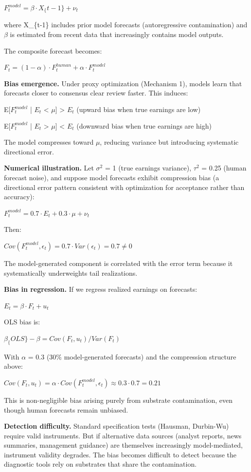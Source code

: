\documentclass[11pt,a4paper]{article}
\begin{document}
$F_t^{model} = \beta \cdot X_\{t-1\} + \nu_t$

where X\_\{t-1\} includes prior model forecasts (autoregressive contamination) and $\beta$ is estimated from recent data that increasingly contains model outputs.

The composite forecast becomes:

$F_t = (1 - \alpha) \cdot F_t^{human} + \alpha \cdot F_t^{model}$

\textbf{Bias emergence.} Under proxy optimization (Mechanism 1), models learn that forecasts closer to consensus clear review faster. This induces:

E{[}$F_t^{model}$ | $E_t$ < $\mu${]} > $E_t$ (upward bias when true earnings are low)

E{[}$F_t^{model}$ | $E_t$ > $\mu${]} < $E_t$ (downward bias when true earnings are high)

The model compresses toward $\mu$, reducing variance but introducing systematic directional error.

\textbf{Numerical illustration.} Let $\sigma^2$ = 1 (true earnings variance), $\tau^2$ = 0.25 (human forecast noise), and suppose model forecasts exhibit compression bias (a directional error pattern consistent with optimization for acceptance rather than accuracy):

$F_t^{model} = 0.7 \cdot E_t + 0.3 \cdot \mu + \nu_t$

Then:

$Cov(F_t^{model}, \epsilon_t) = 0.7 \cdot Var(\epsilon_t) = 0.7 \neq 0$

The model-generated component is correlated with the error term because it systematically underweights tail realizations.

\textbf{Bias in regression.} If we regress realized earnings on forecasts:

$E_t = \beta \cdot F_t + u_t$

OLS bias is:

$\beta_\{OLS\} - \beta = Cov(F_t, u_t) / Var(F_t)$

With $\alpha$ = 0.3 (30\% model-generated forecasts) and the compression structure above:

$Cov(F_t, u_t) = \alpha \cdot Cov(F_t^{model}, \epsilon_t) \approx 0.3 \cdot 0.7 = 0.21$

This is non-negligible bias arising purely from substrate contamination, even though human forecasts remain unbiased.

\textbf{Detection difficulty.} Standard specification tests (Hausman, Durbin-Wu) require valid instruments. But if alternative data sources (analyst reports, news summaries, management guidance) are themselves increasingly model-mediated, instrument validity degrades. The bias becomes difficult to detect because the diagnostic tools rely on substrates that share the contamination.
\end{document}

